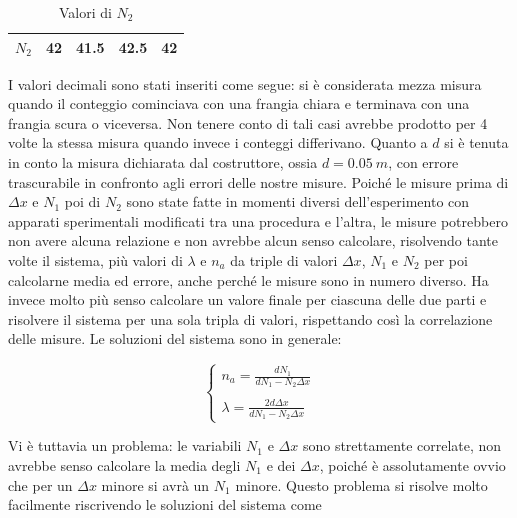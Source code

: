 \documentclass[a4paper,11pt]{article}
\newcommand{\ddfrac}[2]{\ensuremath{\frac{\displaystyle #1}{\displaystyle #2}}}
\begin{document}
\begin{table}[htbp]
	\centering
	\caption{Valori di $N _2$}
	\begin{tabular}{|lrrrr|}
		\bottomrule
		\rowcolor[rgb]{ .267,  .447,  .769} \textcolor[rgb]{ 1,  1,  1}{\textbf{$N _2$}} & \cellcolor[rgb]{ 1,  1,  1} 42 & \cellcolor[rgb]{ 1,  1,  1} 41.5 & \cellcolor[rgb]{ 1,  1,  1} 42.5 & \cellcolor[rgb]{ 1,  1,  1} 42 \\
		\toprule
	\end{tabular}%
	\label{N2}%
\end{table}%

I valori decimali sono stati inseriti come segue: si è considerata mezza misura quando il conteggio cominciava con una frangia chiara e terminava con una frangia scura o viceversa. Non tenere conto di tali casi avrebbe prodotto per 4 volte la stessa misura quando invece i conteggi differivano. Quanto a $d$ si è tenuta in conto la misura dichiarata dal costruttore, ossia $d = \SI{0.05}{m}$, con errore trascurabile in confronto agli errori delle nostre misure.
Poiché le misure prima di $\Delta x$ e $N _1$ poi di $N _2$ sono state fatte in momenti diversi dell'esperimento con apparati sperimentali modificati tra una procedura e l'altra, le misure potrebbero non avere alcuna relazione e non avrebbe alcun senso calcolare, risolvendo tante volte il sistema, più valori di $\lambda$ e $n _a$ da triple di valori $\Delta x$, $N _1$ e $N _2$ per poi calcolarne media ed errore, anche perché le misure sono in numero diverso. Ha invece molto più senso calcolare un valore finale per ciascuna delle due parti e risolvere il sistema per una sola tripla di valori, rispettando così la correlazione delle misure.
Le soluzioni del sistema sono in generale:

\begin{equation}
\begin{cases}
n_a = \ddfrac{dN_1}{dN_1 - N_2 \Delta x} \\ \\ \lambda = \ddfrac{2 d \Delta x}{d N _1 - N_2 \Delta x}
\end{cases}
\end{equation}

Vi è tuttavia un problema: le variabili $N _1$ e $\Delta x$ sono strettamente correlate, non avrebbe senso calcolare la media degli $N _1$ e dei $\Delta x$, poiché è assolutamente ovvio che per un $\Delta x$ minore si avrà un $N _1$ minore. Questo problema si risolve molto facilmente riscrivendo le soluzioni del sistema come
\end{document}
